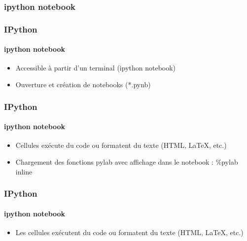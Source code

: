 \subsubsection{ipython notebook}
\begin{frame}[fragile]
\frametitle{IPython}
\framesubtitle{ipython notebook}
\begin{itemize}
 \item Accessible à partir d'un terminal (ipython notebook) 
 \item Ouverture et création de notebooks (*.pynb)
\end{itemize}
\begin{center}
\end{center}
\end{frame}
\begin{frame}[fragile]
\frametitle{IPython}
\framesubtitle{ipython notebook}
\begin{itemize}
 \item Cellules exécute du code ou formatent du texte (HTML, LaTeX, etc.)
 \item Chargement des fonctions pylab avec affichage dans le notebook : \%pylab inline 
\end{itemize}
\begin{center}
\end{center}
\end{frame}
\begin{frame}[fragile]
\frametitle{IPython}
\framesubtitle{ipython notebook}
\begin{itemize}
 \item Les cellules exécutent du code ou formatent du texte (HTML, LaTeX, etc.)
\end{itemize}
\begin{center}
\end{center}
\end{frame}
